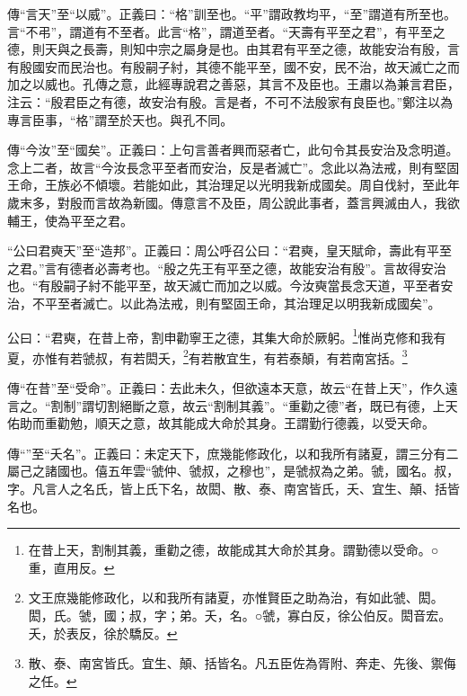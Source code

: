 {\noindent\zhuan{}\fzbyks 傳“言天”至“以威”。正義曰：“格”訓至也。“平”謂政教均平，“至”謂道有所至也。言“不弔”，謂道有不至者。此言“格”，謂道至者。“天壽有平至之君”，有平至之德，則天與之長壽，則知中宗之屬身是也。由其君有平至之德，故能安治有殷，言有殷國安而民治也。有殷嗣子紂，其德不能平至，國不安，民不治，故天滅亡之而加之以威也。孔傳之意，此經專說君之善惡，其言不及臣也。王肅以為兼言君臣，注云：“殷君臣之有德，故安治有殷。言是者，不可不法殷家有良臣也。”鄭注以為專言臣事，“格”謂至於天也。與孔不同。 \par}

{\noindent\zhuan{}\fzbyks 傳“今汝”至“國矣”。正義曰：上句言善者興而惡者亡，此句令其長安治及念明道。念上二者，故言“今汝長念平至者而安治，反是者滅亡”。念此以為法戒，則有堅固王命，王族必不傾壞。若能如此，其治理足以光明我新成國矣。周自伐紂，至此年歲末多，對殷而言故為新國。傳意言不及臣，周公說此事者，蓋言興滅由人，我欲輔王，使為平至之君。 \par}

{\noindent\shu{}\fzkt “公曰君奭天”至“造邦”。正義曰：周公呼召公曰：“君奭，皇天賦命，壽此有平至之君。”言有德者必壽考也。“殷之先王有平至之德，故能安治有殷”。言故得安治也。“有殷嗣子紂不能平至，故天滅亡而加之以威。今汝奭當長念天道，平至者安治，不平至者滅亡。以此為法戒，則有堅固王命，其治理足以明我新成國矣”。 \par}

公曰：“君奭，在昔上帝，割申勸寧王之德，其集大命於厥躬。\footnote{在昔上天，割制其義，重勸之德，故能成其大命於其身。謂勤德以受命。○重，直用反。}惟尚克修和我有夏，亦惟有若虢叔，有若閎夭，\footnote{文王庶幾能修政化，以和我所有諸夏，亦惟賢臣之助為治，有如此虢、閎。閎，氏。虢，國；叔，字；弟。夭，名。○虢，寡白反，徐公伯反。閎音宏。夭，於表反，徐於驕反。}有若散宜生，有若泰顛，有若南宮括。\footnote{散、泰、南宮皆氏。宜生、顛、括皆名。凡五臣佐為胥附、奔走、先後、禦侮之任。}


{\noindent\zhuan{}\fzbyks 傳“在昔”至“受命”。正義曰：去此未久，但欲遠本天意，故云“在昔上天”，作久遠言之。“割制”謂切割絕斷之意，故云“割制其義”。“重勸之德”者，既已有德，上天佑助而重勸勉，順天之意，故其能成大命於其身。王謂勤行德義，以受天命。 \par}

{\noindent\zhuan{}\fzbyks 傳“”至“夭名”。正義曰：未定天下，庶幾能修政化，以和我所有諸夏，謂三分有二屬己之諸國也。僖五年雲“虢仲、虢叔，之穆也”，是虢叔為之弟。虢，國名。叔，字。凡言人之名氏，皆上氏下名，故閎、散、泰、南宮皆氏，夭、宜生、顛、括皆名也。 \par}

